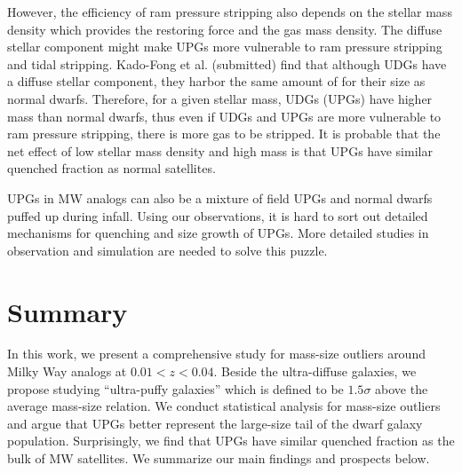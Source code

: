\documentclass[twocolumn,astrosymb,twocolappendix]{aastex631}
\newcommand{\jiaxuan}[1]{\textcolor{orange}{\textbf{Jiaxuan: #1}}}
\begin{document}
\begin{CJK*}{UTF8}{gbsn}
However, the efficiency of ram pressure stripping also depends on the stellar mass density which provides the restoring force and the gas mass density. The diffuse stellar component might make UPGs more vulnerable to ram pressure stripping and tidal stripping. Kado-Fong et al. (submitted) find that although UDGs have a diffuse stellar component, they harbor the same amount of  for their size as normal dwarfs. Therefore, for a given stellar mass, UDGs (UPGs) have higher  mass than normal dwarfs, thus even if UDGs and UPGs are more vulnerable to ram pressure stripping, there is more gas to be stripped. It is probable that the net effect of low stellar mass density and high  mass is that UPGs have similar quenched fraction as normal satellites. 

UPGs in MW analogs can also be a mixture of field UPGs and normal dwarfs puffed up during infall. Using our observations, it is hard to sort out detailed mechanisms for quenching and size growth of UPGs. More detailed studies in observation and simulation are needed to solve this puzzle.







\section{Summary}\label{sec:summary}
In this work, we present a comprehensive study for mass-size outliers around Milky Way analogs at $0.01 < z < 0.04$. Beside the ultra-diffuse galaxies, we propose studying ``ultra-puffy galaxies'' which is defined to be $1.5\sigma$ above the average mass-size relation. We conduct statistical analysis for mass-size outliers and argue that UPGs better represent the large-size tail of the dwarf galaxy population. Surprisingly, we find that UPGs have similar quenched fraction as the bulk of MW satellites. We summarize our main findings and prospects below. 


\end{CJK*}
\end{document}
